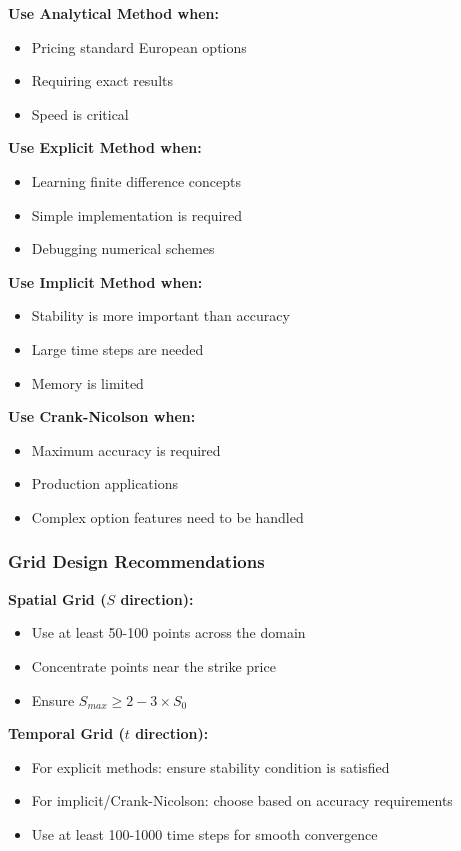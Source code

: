 \documentclass[12pt,a4paper]{article}
\numberwithin{algorithm}{subsection}
\begin{document}
\textbf{Use Analytical Method when:}
\begin{itemize}
\item Pricing standard European options
\item Requiring exact results
\item Speed is critical
\end{itemize}

\textbf{Use Explicit Method when:}
\begin{itemize}
\item Learning finite difference concepts
\item Simple implementation is required
\item Debugging numerical schemes
\end{itemize}

\textbf{Use Implicit Method when:}
\begin{itemize}
\item Stability is more important than accuracy
\item Large time steps are needed
\item Memory is limited
\end{itemize}

\textbf{Use Crank-Nicolson when:}
\begin{itemize}
\item Maximum accuracy is required
\item Production applications
\item Complex option features need to be handled
\end{itemize}

\subsubsection{Grid Design Recommendations}

\textbf{Spatial Grid ($S$ direction):}
\begin{itemize}
\item Use at least 50-100 points across the domain
\item Concentrate points near the strike price
\item Ensure $S_{max} \geq 2-3 \times S_0$
\end{itemize}

\textbf{Temporal Grid ($t$ direction):}
\begin{itemize}
\item For explicit methods: ensure stability condition is satisfied
\item For implicit/Crank-Nicolson: choose based on accuracy requirements
\item Use at least 100-1000 time steps for smooth convergence
\end{itemize}
\end{document}
